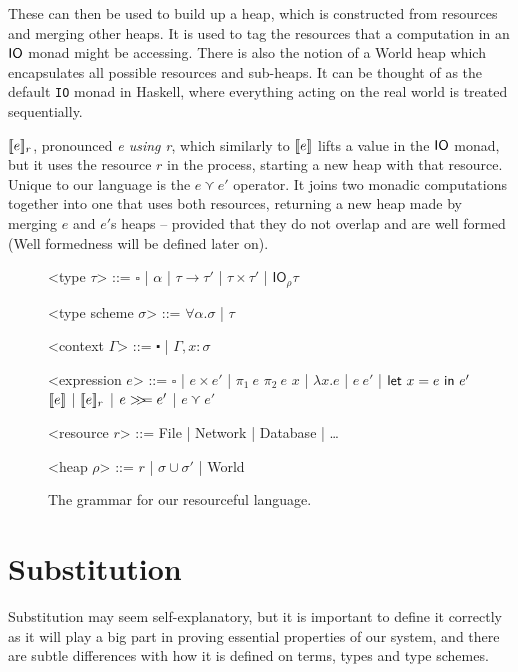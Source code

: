 These can then be used to build up a heap, which is constructed from
resources and merging other heaps. It is used to tag the resources
that a computation in an $\IO$ monad might be accessing. There is also
the notion of a \textsf{World} heap which encapsulates all possible
resources and sub-heaps. It can be thought of as the default
\texttt{IO} monad in Haskell, where everything acting on the real
world is treated sequentially.

$\use{r}{e}$, pronounced \textit{e using r}, which similarly to
$\lift{e}$ lifts a value in the $\IO$ monad, but it uses the resource
$r$ in the process, starting a new heap with that resource. Unique to
our language is the $e \curlyvee e'$ operator. It joins two monadic
computations together into one that uses both resources, returning a
new heap made by merging $e$ and $e'$s heaps -- provided that they do
not overlap and are well formed (Well formedness will be defined later
on).

\begin{figure}
\begin{grammar}

  <type $\tau$> ::= $\square$ | $\alpha$ | $\tau \rightarrow \tau'$ | $\tau \times \tau'$ | $\textsf{IO}_\rho \tau$
  
  <type scheme $\sigma$> ::= $\forall \alpha . \sigma$ | $\tau$

  <context $\Gamma$> ::= $\centerdot$ | $\Gamma , x : \sigma$

  <expression $e$> ::= $\square$ | $e \times e'$ | $\pi_1 \ e$ $\pi_2 \ e$
  \alt $x$ | $\lambda x . e$ | $e \ e'$ | $\letin{x = e}{e'}$
  \alt $\lift{e}$ | $\use{r}{e}$ | $e \bind e'$ | $e \curlyvee e'$

  <resource $r$> ::= \textsf{File} | \textsf{Network} |
  \textsf{Database} | \ldots

  <heap $\rho$> ::= $r$ | $\sigma \cup \sigma'$ | \textsf{World}

\end{grammar}
\caption{The grammar for our resourceful language.} \label{fig:grammar}
\end{figure}

\section{Substitution}
Substitution may seem self-explanatory, but it is important to define
it correctly as it will play a big part in proving essential
properties of our system, and there are subtle differences with how it
is defined on terms, types and type schemes.

